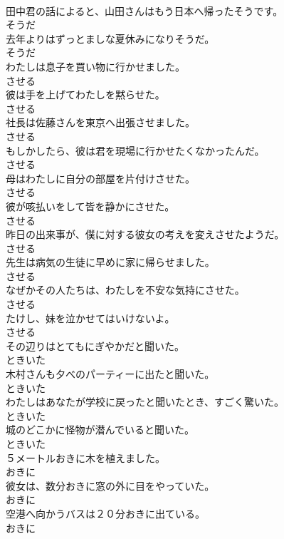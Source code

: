 \documentclass[8pt]{extreport}
\begin{document}
\begin{CJK}{UTF8}{min}
\\	田中君の話によると、山田さんはもう日本へ帰ったそうです。	
\\	そうだ	
\\	去年よりはずっとましな夏休みになりそうだ。	
\\	そうだ	
\\	わたしは息子を買い物に行かせました。	
\\	させる	
\\	彼は手を上げてわたしを黙らせた。	
\\	させる	
\\	社長は佐藤さんを東京へ出張させました。	
\\	させる	
\\	もしかしたら、彼は君を現場に行かせたくなかったんだ。	
\\	させる	
\\	母はわたしに自分の部屋を片付けさせた。	
\\	させる	
\\	彼が咳払いをして皆を静かにさせた。	
\\	させる	
\\	昨日の出来事が、僕に対する彼女の考えを変えさせたようだ。	
\\	させる	
\\	先生は病気の生徒に早めに家に帰らせました。	
\\	させる	
\\	なぜかその人たちは、わたしを不安な気持にさせた。	
\\	させる	
\\	たけし、妹を泣かせてはいけないよ。	
\\	させる	
\\	その辺りはとてもにぎやかだと聞いた。	
\\	ときいた	
\\	木村さんも夕べのパーティーに出たと聞いた。	
\\	ときいた	
\\	わたしはあなたが学校に戻ったと聞いたとき、すごく驚いた。	
\\	ときいた	
\\	城のどこかに怪物が潜んでいると聞いた。	
\\	ときいた	
\\	５メートルおきに木を植えました。	
\\	おきに	
\\	彼女は、数分おきに窓の外に目をやっていた。	
\\	おきに	
\\	空港へ向かうバスは２０分おきに出ている。	
\\	おきに	

\end{CJK}
\end{document}
